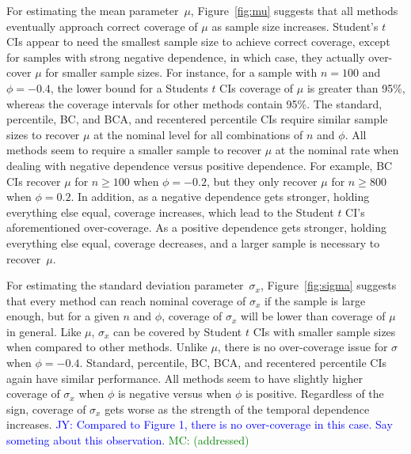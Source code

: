 \documentclass[12pt, letterpaper, titlepage]{article}
\newcommand{\jy}[1]{\textcolor{blue}{JY: #1}}
\newcommand{\mc}[1]{\textcolor{green}{MC: (#1)}}
\begin{document}
For estimating the mean parameter~$\mu$, Figure~\ref{fig:mu} suggests that all
methods eventually approach correct coverage of $\mu$ as sample size
increases. Student's $t$ CIs appear to need the smallest sample size
to achieve correct coverage, except for samples with strong negative
dependence, in which case, they actually over-cover $\mu$ for smaller sample
sizes. For instance, for a sample with $n = 100$ and $\phi = -0.4$, the lower
bound for a Students $t$ CIs coverage of $\mu$ is greater than 95\%, whereas
the coverage intervals for other methods contain 95\%. The standard,
percentile, BC, and BCA, and recentered percentile CIs require similar sample
sizes to recover $\mu$ at the nominal level for all combinations of $n$ and
$\phi$. All methods seem to require a smaller sample to recover $\mu$ at the
nominal rate when dealing with negative dependence versus positive dependence.
For example, BC CIs recover $\mu$ for $n \geq 100$ when $\phi = -0.2$, but
they only recover $\mu$ for $n \geq 800$ when $\phi = 0.2$. In addition, as a
negative dependence gets stronger, holding everything else equal, coverage
increases, which lead to the Student $t$ CI's aforementioned over-coverage. As
a positive dependence gets stronger, holding everything else equal, coverage
decreases, and a larger sample is necessary to recover~$\mu$.


For estimating the standard deviation parameter~$\sigma_x$,
Figure~\ref{fig:sigma} suggests that every method can reach nominal coverage of
$\sigma_x$ if the sample is large enough, but for a given $n$ and $\phi$,
coverage of $\sigma_x$ will be lower than coverage of $\mu$ in general. Like
$\mu$, $\sigma_x$ can be covered by Student $t$ CIs with smaller sample sizes
when compared to other methods. Unlike $\mu$, there is no over-coverage issue for
$\sigma$ when $\phi = -0.4$. Standard, percentile, BC, BCA, and recentered percentile
CIs again have similar performance. All methods seem to have slightly higher
coverage of $\sigma_x$ when $\phi$ is negative versus when $\phi$ is positive.
Regardless of the sign, coverage of $\sigma_x$ gets worse as the strength of
the temporal dependence increases.
\jy{Compared to Figure 1, there is no over-coverage in this case. Say someting
  about this observation.} \mc{addressed}
\end{document}
